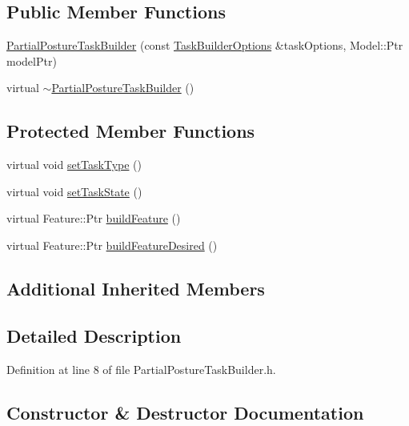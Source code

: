 \subsection*{Public Member Functions}
\begin{DoxyCompactItemize}
\item 
\hyperlink{classocra_1_1PartialPostureTaskBuilder_a4c8585a8722241b52a02ccb73bb3a675}{Partial\+Posture\+Task\+Builder} (const \hyperlink{classocra_1_1TaskBuilderOptions}{Task\+Builder\+Options} \&task\+Options, Model\+::\+Ptr model\+Ptr)
\item 
virtual \hyperlink{classocra_1_1PartialPostureTaskBuilder_a59c3cec0e4480654c360af17dc195b5a}{$\sim$\+Partial\+Posture\+Task\+Builder} ()
\end{DoxyCompactItemize}
\subsection*{Protected Member Functions}
\begin{DoxyCompactItemize}
\item 
virtual void \hyperlink{classocra_1_1PartialPostureTaskBuilder_acf2b5f880dc19e43356552b348d8a010}{set\+Task\+Type} ()
\item 
virtual void \hyperlink{classocra_1_1PartialPostureTaskBuilder_a70b416b1666a772940d96338a317af0a}{set\+Task\+State} ()
\item 
virtual Feature\+::\+Ptr \hyperlink{classocra_1_1PartialPostureTaskBuilder_ab4a80855ccc820bbeabf4eed87487784}{build\+Feature} ()
\item 
virtual Feature\+::\+Ptr \hyperlink{classocra_1_1PartialPostureTaskBuilder_a1a853459b32e838d04205459c608f5b2}{build\+Feature\+Desired} ()
\end{DoxyCompactItemize}
\subsection*{Additional Inherited Members}


\subsection{Detailed Description}


Definition at line 8 of file Partial\+Posture\+Task\+Builder.\+h.



\subsection{Constructor \& Destructor Documentation}
\hypertarget{classocra_1_1PartialPostureTaskBuilder_a4c8585a8722241b52a02ccb73bb3a675}{}\label{classocra_1_1PartialPostureTaskBuilder_a4c8585a8722241b52a02ccb73bb3a675} 
